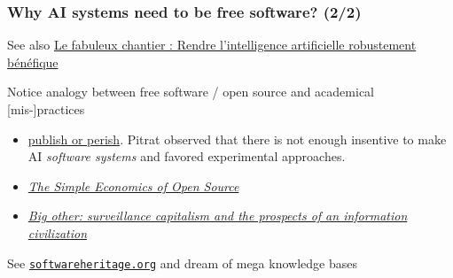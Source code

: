 \documentclass[xcolor=svgnames,final,smaller,a4]{beamer}
\begin{document}
 \begin{frame}
   \frametitle{Why AI systems need to be free software? (2/2)}

   See also \href{https://laboutique.edpsciences.fr/produit/1107/9782759824304/Le\%20fabuleux\%20chantier}{
   Le fabuleux chantier : Rendre l’intelligence artificielle
   robustement bénéfique {}}

   Notice analogy between free software / open source and academical [mis-]practices

   \bigskip
   

   \begin{itemize}
   \item \href{https://en.wikipedia.org/wiki/Publish_or_perish}{publish or perish}. Pitrat observed that there is not enough insentive to make AI \emph{software systems} and favored experimental approaches.

   \item \href{https://www.nber.org/papers/w7600}{\textit{The Simple Economics of Open Source}}

   \item \href{https://cryptome.org/2015/07/big-other.pdf}{\textit{Big other: surveillance capitalism and the prospects of an information civilization}}
   \end{itemize}

   \medskip
   
   See \href{https://softwareheritage.org/}{\texttt{softwareheritage.org}}
   and dream of mega  knowledge bases
 \end{frame}
\end{document}
